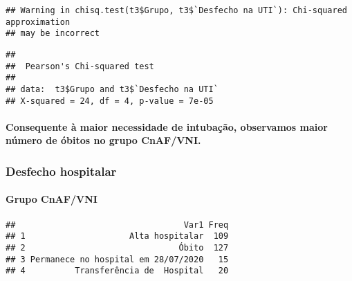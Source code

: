 \documentclass[
]{article}
\newenvironment{Shaded}{\begin{snugshade}}{\end{snugshade}}
\newcommand{\AttributeTok}[1]{\textcolor[rgb]{0.77,0.63,0.00}{#1}}
\newcommand{\FunctionTok}[1]{\textcolor[rgb]{0.00,0.00,0.00}{#1}}
\newcommand{\NormalTok}[1]{#1}
\newcommand{\SpecialCharTok}[1]{\textcolor[rgb]{0.00,0.00,0.00}{#1}}
\newcommand{\StringTok}[1]{\textcolor[rgb]{0.31,0.60,0.02}{#1}}
\begin{document}
\begin{verbatim}
## Warning in chisq.test(t3$Grupo, t3$`Desfecho na UTI`): Chi-squared approximation
## may be incorrect
\end{verbatim}

\begin{verbatim}
## 
##  Pearson's Chi-squared test
## 
## data:  t3$Grupo and t3$`Desfecho na UTI`
## X-squared = 24, df = 4, p-value = 7e-05
\end{verbatim}

\hypertarget{consequente-uxe0-maior-necessidade-de-intubauxe7uxe3o-observamos-maior-nuxfamero-de-uxf3bitos-no-grupo-cnafvni.}{%
\paragraph{Consequente à maior necessidade de intubação, observamos
maior número de óbitos no grupo
CnAF/VNI.}\label{consequente-uxe0-maior-necessidade-de-intubauxe7uxe3o-observamos-maior-nuxfamero-de-uxf3bitos-no-grupo-cnafvni.}}

\hypertarget{desfecho-hospitalar}{%
\subsubsection{\texorpdfstring{\textbf{Desfecho
hospitalar}}{Desfecho hospitalar}}\label{desfecho-hospitalar}}

\hypertarget{grupo-cnafvni-6}{%
\paragraph{\texorpdfstring{\textbf{Grupo
CnAF/VNI}}{Grupo CnAF/VNI}}\label{grupo-cnafvni-6}}

\begin{Shaded}
\end{Shaded}

\begin{verbatim}
##                                  Var1 Freq
## 1                     Alta hospitalar  109
## 2                               Óbito  127
## 3 Permanece no hospital em 28/07/2020   15
## 4          Transferência de  Hospital   20
\end{verbatim}
\end{document}
